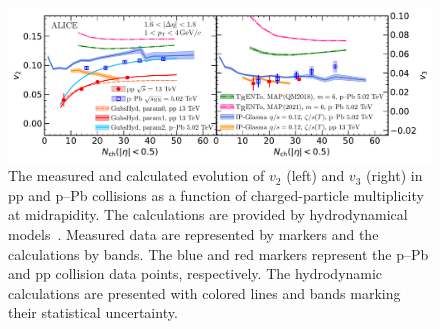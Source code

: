 \begin{figure}[h!]
	\centering
	\includegraphics[width=1.0\textwidth]{figures/FIG7_v2Mult_allSystems_Hydro.pdf} 
	\caption{The measured and calculated evolution of $v_2$ (left) and $v_3$ (right) in pp and p--Pb collisions as a function of charged-particle multiplicity at midrapidity. The calculations are provided by hydrodynamical models~\cite{Parkkila:2021yha,Bernhard:2016tnd,Schenke:2020mbo,Taghavi:2019mqz}. Measured data are represented by markers and the calculations by bands.
    The blue and red markers represent the p--Pb and pp collision data points, respectively. The hydrodynamic calculations are presented with colored lines and bands marking their statistical uncertainty.} 
	\label{fig:vnmult_model}
\end{figure}

